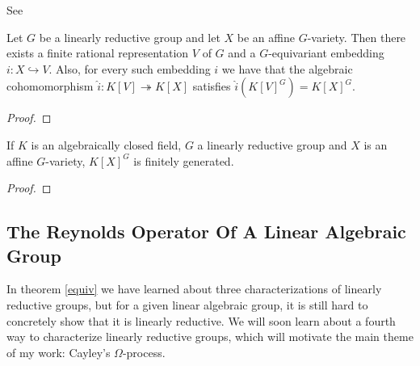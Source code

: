 \begin{lemma}
  See \cite[2.2.9]{DK15}

  Let $G$ be a linearly reductive group and let $X$ be an affine $G$-variety.
  Then there exists a finite rational representation $V$ of $G$ and a $G$-equivariant embedding $i \colon X \hookrightarrow V$.
  Also, for every such embedding $i$ we have that the algebraic cohomomorphism $\hat{i} \colon K[V] \twoheadrightarrow K[X]$ satisfies $\hat{i}(K[V]^G) = K[X]^G$.
\end{lemma}

\begin{proof}
  
\end{proof}

\begin{theorem}
  If $K$ is an algebraically closed field, $G$ a linearly reductive group and $X$ is an affine $G$-variety, $K[X]^G$ is finitely generated.
\end{theorem}

\begin{proof}
  
\end{proof}

\subsection{The Reynolds Operator Of A Linear Algebraic Group}



In theorem \ref{equiv} we have learned about three characterizations of linearly reductive groups, but for a given linear algebraic group, it is still hard to concretely show that it is linearly reductive.
We will soon learn about a fourth way to characterize linearly reductive groups, which will motivate the main theme of my work:  Cayley's $\Omega$-process.

